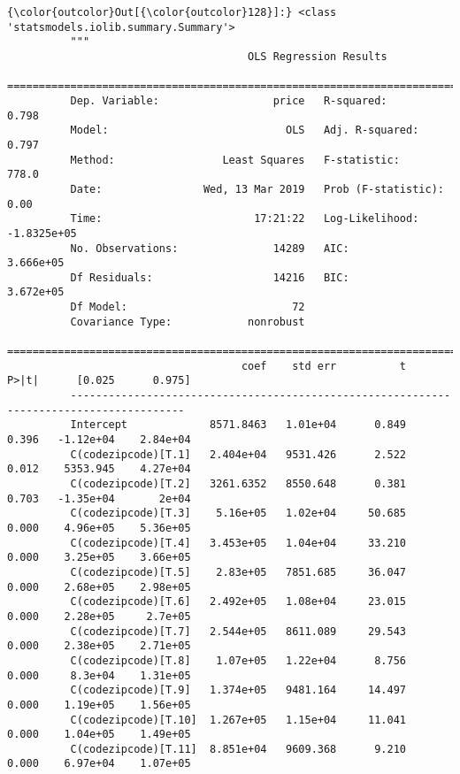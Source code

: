 \documentclass[11pt]{article}
\begin{document}
\begin{Verbatim}[commandchars=\\\{\}]
{\color{outcolor}Out[{\color{outcolor}128}]:} <class 'statsmodels.iolib.summary.Summary'>
          """
                                      OLS Regression Results                            
          ==============================================================================
          Dep. Variable:                  price   R-squared:                       0.798
          Model:                            OLS   Adj. R-squared:                  0.797
          Method:                 Least Squares   F-statistic:                     778.0
          Date:                Wed, 13 Mar 2019   Prob (F-statistic):               0.00
          Time:                        17:21:22   Log-Likelihood:            -1.8325e+05
          No. Observations:               14289   AIC:                         3.666e+05
          Df Residuals:                   14216   BIC:                         3.672e+05
          Df Model:                          72                                         
          Covariance Type:            nonrobust                                         
          ========================================================================================
                                     coef    std err          t      P>|t|      [0.025      0.975]
          ----------------------------------------------------------------------------------------
          Intercept             8571.8463   1.01e+04      0.849      0.396   -1.12e+04    2.84e+04
          C(codezipcode)[T.1]   2.404e+04   9531.426      2.522      0.012    5353.945    4.27e+04
          C(codezipcode)[T.2]   3261.6352   8550.648      0.381      0.703   -1.35e+04       2e+04
          C(codezipcode)[T.3]    5.16e+05   1.02e+04     50.685      0.000    4.96e+05    5.36e+05
          C(codezipcode)[T.4]   3.453e+05   1.04e+04     33.210      0.000    3.25e+05    3.66e+05
          C(codezipcode)[T.5]    2.83e+05   7851.685     36.047      0.000    2.68e+05    2.98e+05
          C(codezipcode)[T.6]   2.492e+05   1.08e+04     23.015      0.000    2.28e+05     2.7e+05
          C(codezipcode)[T.7]   2.544e+05   8611.089     29.543      0.000    2.38e+05    2.71e+05
          C(codezipcode)[T.8]    1.07e+05   1.22e+04      8.756      0.000     8.3e+04    1.31e+05
          C(codezipcode)[T.9]   1.374e+05   9481.164     14.497      0.000    1.19e+05    1.56e+05
          C(codezipcode)[T.10]  1.267e+05   1.15e+04     11.041      0.000    1.04e+05    1.49e+05
          C(codezipcode)[T.11]  8.851e+04   9609.368      9.210      0.000    6.97e+04    1.07e+05

\end{Verbatim}
\end{document}
